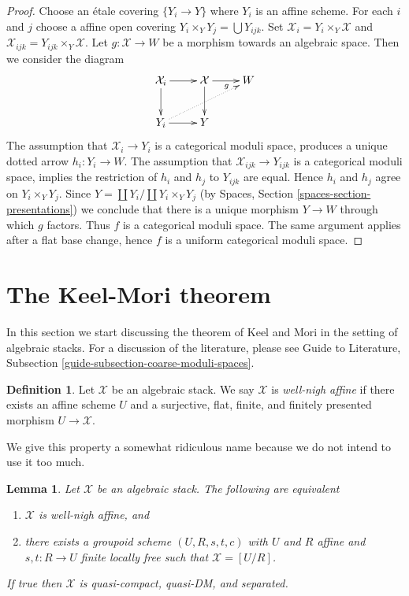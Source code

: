 \documentclass{stacks-project}
\theoremstyle{plain}
\newtheorem{lemma}[subsection]{Lemma}
\theoremstyle{definition}
\newtheorem{definition}[subsection]{Definition}
\theoremstyle{remark}
\numberwithin{equation}{subsection}
\begin{document}
\begin{proof}
Choose an \'etale covering $\{Y_i \to Y\}$ where $Y_i$ is an affine scheme.
For each $i$ and $j$ choose a affine open covering
$Y_i \times_Y Y_j = \bigcup Y_{ijk}$.
Set $\mathcal{X}_i = Y_i \times_Y \mathcal{X}$ and
$\mathcal{X}_{ijk} = Y_{ijk} \times_Y \mathcal{X}$.
Let $g : \mathcal{X} \to W$ be a morphism towards
an algebraic space. Then we consider the diagram
$$
\xymatrix{
\mathcal{X}_i \ar[r] \ar[d] & \mathcal{X} \ar[d] \ar[r]_g & W \\
Y_i \ar[r] \ar@{..>}[rru] & Y
}
$$
The assumption that $\mathcal{X}_i \to Y_i$ is a categorical moduli
space, produces a unique dotted arrow $h_i : Y_i \to W$.
The assumption that $\mathcal{X}_{ijk} \to Y_{ijk}$ is a categorical
moduli space, implies the restriction of $h_i$ and $h_j$ to
$Y_{ijk}$ are equal. Hence $h_i$ and $h_j$ agree on $Y_i \times_Y Y_j$.
Since $Y = \coprod Y_i / \coprod Y_i \times_Y Y_j$
(by Spaces, Section \ref{spaces-section-presentations}) we conclude
that there is a unique morphism $Y \to W$ through which $g$ factors.
Thus $f$ is a categorical moduli space. The same argument applies
after a flat base change, hence $f$ is a uniform categorical moduli space.
\end{proof}







\section{The Keel-Mori theorem}
\label{section-Keel-Mori}

\noindent
In this section we start discussing the theorem of Keel and Mori
in the setting of algebraic stacks. For a discussion of the
literature, please see Guide to Literature, Subsection
\ref{guide-subsection-coarse-moduli-spaces}.

\begin{definition}
\label{definition-well-nigh-affine}
Let $\mathcal{X}$ be an algebraic stack. We say $\mathcal{X}$
is {\it well-nigh affine} if there exists an affine scheme $U$
and a surjective, flat, finite, and finitely presented morphism
$U \to \mathcal{X}$.
\end{definition}

\noindent
We give this property a somewhat ridiculous name because we do not intend to
use it too much.

\begin{lemma}
\label{lemma-well-nigh-affine}
Let $\mathcal{X}$ be an algebraic stack. The following are equivalent
\begin{enumerate}
\item $\mathcal{X}$ is well-nigh affine, and
\item there exists a groupoid scheme $(U, R, s, t, c)$ with $U$ and
$R$ affine and $s, t : R \to U$ finite locally free such that
$\mathcal{X} = [U/R]$.
\end{enumerate}
If true then $\mathcal{X}$ is quasi-compact, quasi-DM, and separated.
\end{lemma}
\end{document}
